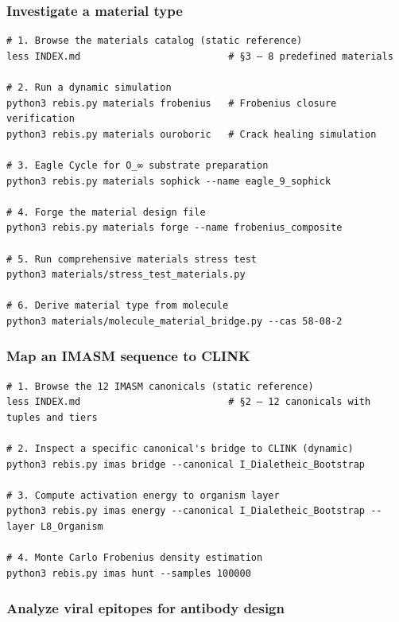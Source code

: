 \documentclass[12pt,a4paper]{article}
\begin{document}
\hypertarget{investigate-a-material-type}{%
\subsubsection{Investigate a material
type}\label{investigate-a-material-type}}

\begin{verbatim}
# 1. Browse the materials catalog (static reference)
less INDEX.md                          # §3 — 8 predefined materials

# 2. Run a dynamic simulation
python3 rebis.py materials frobenius   # Frobenius closure verification
python3 rebis.py materials ouroboric   # Crack healing simulation

# 3. Eagle Cycle for O_∞ substrate preparation
python3 rebis.py materials sophick --name eagle_9_sophick

# 4. Forge the material design file
python3 rebis.py materials forge --name frobenius_composite

# 5. Run comprehensive materials stress test
python3 materials/stress_test_materials.py

# 6. Derive material type from molecule
python3 materials/molecule_material_bridge.py --cas 58-08-2
\end{verbatim}

\hypertarget{map-an-imasm-sequence-to-clink}{%
\subsubsection{Map an IMASM sequence to
CLINK}\label{map-an-imasm-sequence-to-clink}}

\begin{verbatim}
# 1. Browse the 12 IMASM canonicals (static reference)
less INDEX.md                          # §2 — 12 canonicals with tuples and tiers

# 2. Inspect a specific canonical's bridge to CLINK (dynamic)
python3 rebis.py imas bridge --canonical I_Dialetheic_Bootstrap

# 3. Compute activation energy to organism layer
python3 rebis.py imas energy --canonical I_Dialetheic_Bootstrap --layer L8_Organism

# 4. Monte Carlo Frobenius density estimation
python3 rebis.py imas hunt --samples 100000
\end{verbatim}

\hypertarget{analyze-viral-epitopes-for-antibody-design}{%
\subsubsection{Analyze viral epitopes for antibody
design}\label{analyze-viral-epitopes-for-antibody-design}}
\end{document}
